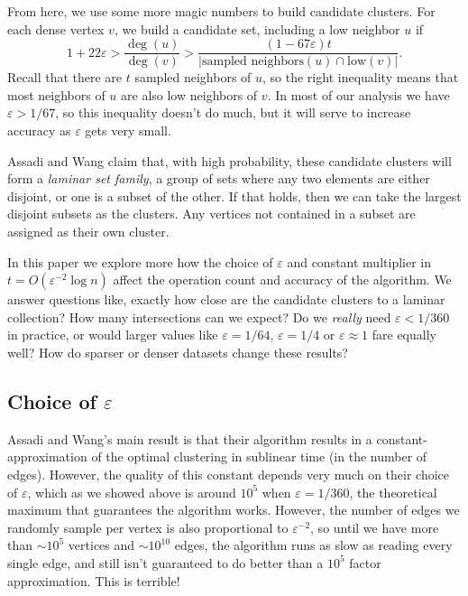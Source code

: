 \documentclass[
]{article}
\begin{document}
From here, we use some more magic numbers to build candidate clusters.
For each dense vertex {\(v\)}, we build a candidate set, including a low
neighbor {\(u\)} if
  {\[1 + 22\varepsilon > \frac{\deg(u)}{\deg(v)} > \frac{(1 - 67\varepsilon)t}{|\text{sampled\ neighbors}(u) \cap \text{low}(v)|}.\]}Recall
that there are {\(t\)} sampled neighbors of {\(u\)}, so the right
inequality means that most neighbors of {\(u\)} are also low neighbors
of {\(v\)}. In most of our analysis we have {\(\varepsilon > 1/67\)}, so
this inequality doesn't do much, but it will serve to
increase accuracy as {\(\varepsilon\)} gets very small.

Assadi and Wang claim that, with high probability, these candidate clusters will form a
\emph{laminar set family}, a group of sets where any two elements are either disjoint,
or one is a subset of the other.
If that holds, then we can take the largest disjoint subsets as the clusters.
Any vertices not contained in a subset are assigned as their own cluster.

In this paper we explore more how the choice of {\(\varepsilon\)} and
constant multiplier in {\(t = O(\varepsilon^{- 2}\log n)\)} affect the
operation count and accuracy of the algorithm. We answer questions like,
exactly how close are the candidate clusters to a laminar collection?
How many intersections can we expect? Do we \emph{really} need
  {\(\varepsilon < 1/360\)} in practice, or would larger values like
  {\(\varepsilon = 1/64\)}, {\(\varepsilon = 1/4\)} or
  {\(\varepsilon \approx 1\)} fare equally well? How do sparser or denser
datasets change these results?

\hypertarget{choice-of-varepsilon}{%
  \subsection{\texorpdfstring{Choice of
        {\(\varepsilon\)}}{Choice of \textbackslash varepsilon}}\label{choice-of-varepsilon}}

Assadi and Wang's main result is that their algorithm
results in a constant-approximation of the optimal clustering in
sublinear time (in the number of edges). However, the quality of this constant depends very much
on their choice of {\(\varepsilon\)}, which as we showed above is around $10^5$ when $\varepsilon = 1/360$, the theoretical maximum that guarantees the algorithm works. However, the number of edges we randomly sample per vertex is also proportional to $\varepsilon^{-2}$, so until we have more than $\sim 10^{5}$ vertices and $\sim 10^{10}$ edges, the algorithm runs as slow as reading every single edge, and still isn't guaranteed to do better than a $10^5$ factor approximation. This is terrible!
\end{document}
